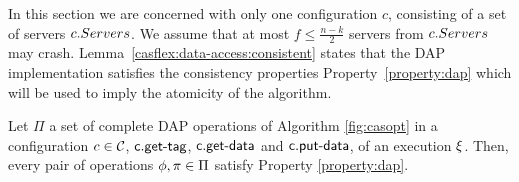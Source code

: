 In this section we are concerned with only one configuration $c$, consisting of a set of servers 
$c.Servers$.
We assume that at most $f \leq \frac{n-k}{2}$ servers from $c.Servers$ may crash.  
Lemma~\ref{casflex:data-access:consistent} states that the DAP implementation 
 satisfies the  consistency properties Property~\ref{property:dap}  which will be used to 
imply the atomicity of the \ares{} algorithm. 
\label{sec:primitives}

						
 \begin{theorem}[Safety]\label{casflex:data-access:consistent}
Let $\Pi$ a set of complete DAP operations of Algorithm \ref{fig:casopt} in a configuration $c\in\mathcal{C}$,
$\act{c.get-tag}$, $\act{c.get-data}$ and $\act{c.put-data}$,
of an execution $\EX$. Then, every pair of operations $\phi,\pi\in\Pi$ satisfy Property \ref{property:dap}.
\end{theorem}

